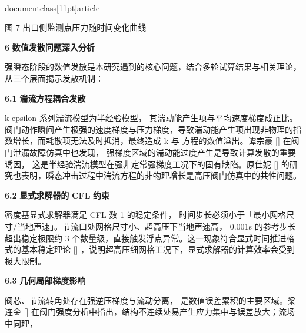 \\documentclass[11pt]{article}
\begin{document}
\par
\par
\par
图 7    出口侧监测点压力随时间变化曲线\par

\par
\par
\textbf{6    }\textbf{数值发散问题深入分析}\par

强瞬态阶段的数值发散是本研究遇到的核心问题，结合多轮试算结果与相关理论，从三个层面揭示发散机制：\par

\par
\textbf{6.1    }\textbf{湍流方程耦合发散}\par

k-epsilon 系列湍流模型为半经验模型， 其湍动能产生项与平均速度梯度成正比。阀门动作瞬间产生极强的速度梯度与压力梯度，导致湍动能产生项出现非物理的指数增长，而耗散项无法及时抵消，最终造成 k 与  方程的数值溢出。谭宗豪 [\cite{fe880629_9ce4_4876_a173_e24a97d827f4_基于数字孪生的管道阀门监测技术研究_谭宗豪}]  在阀门泄漏故障仿真中也发现， 强梯度区域的湍动能过度产生是导致计算发散的重要诱因， 这是半经验湍流模型在强非定常强梯度工况下的固有缺陷。原佳妮 [\cite{fe880629_9ce4_4876_a173_e24a97d827f4_基于数字孪生的管道阀门监测技术研究_谭宗豪}]   的研究也表明，瞬态冲击过程中湍流方程的非物理增长是高压阀门仿真中的共性问题。\par

\par
\textbf{6.2    }\textbf{显式求解器的} \textbf{CFL}\textbf{ }\textbf{约束}\par

密度基显式求解器满足 CFL 数 1  的稳定条件， 时间步长必须小于「最小网格尺寸/当地声速」。节流口处网格尺寸小、超高压下当地声速高， 0.001s 的参考步长超出稳定极限约 3 个数量级，直接触发浮点异常。这一现象符合显式时间推进格式的基本稳定理论 [\cite{fe880629_9ce4_4876_a173_e24a97d827f4_基于数字孪生的管道阀门监测技术研究_谭宗豪}] ，说明超高压细网格工况下，显式求解器的计算效率会受到极大限制。\par

\par
\textbf{6.3    }\textbf{几何局部梯度影响}\par

阀芯、节流转角处存在强逆压梯度与流动分离， 是数值误差累积的主要区域。梁连金 [\cite{fe880629_9ce4_4876_a173_e24a97d827f4_基于数字孪生的管道阀门监测技术研究_谭宗豪}]  在阀门强度分析中指出，结构不连续处易产生应力集中与误差放大；流场中同理，\par
\end{document}
